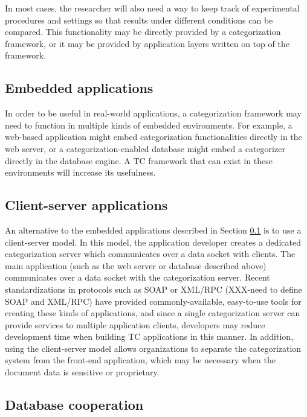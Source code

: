 In most cases, the researcher will also need a way to keep track of
experimental procedures and settings so that results under different
conditions can be compared.  This functionality may be directly
provided by a categorization framework, or it may be provided by
application layers written on top of the framework.


\subsection{Embedded applications}
\label{embedded-apps}

In order to be useful in real-world applications, a categorization
framework may need to function in multiple kinds of embedded
environments.  For example, a web-based application might embed
categorization functionalities directly in the web server, or a
categorization-enabled database might embed a categorizer directly in
the database engine.  A TC framework that can exist in these
environments will increase its usefulness.

\subsection{Client-server applications}

An alternative to the embedded applications described in Section
\ref{embedded-apps} is to use a client-server model.  In this model,
the application developer creates a dedicated categorization server
which communicates over a data socket with clients.  The main
application (such as the web server or database described above)
communicates over a data socket with the categorization server.
Recent standardizations in protocols such as SOAP or XML/RPC (XXX-need to define SOAP and XML/RPC)
\cite{XXX-xmlrpc} have provided commonly-available, easy-to-use tools
for creating these kinds of applications, and since a single
categorization server can provide services to multiple application
clients, developers may reduce development time when building TC
applications in this manner.  In addition, using the client-server
model allows organizations to separate the categorization system from
the front-end application, which may be necessary when the document
data is sensitive or proprietary.

\subsection{Database cooperation}

